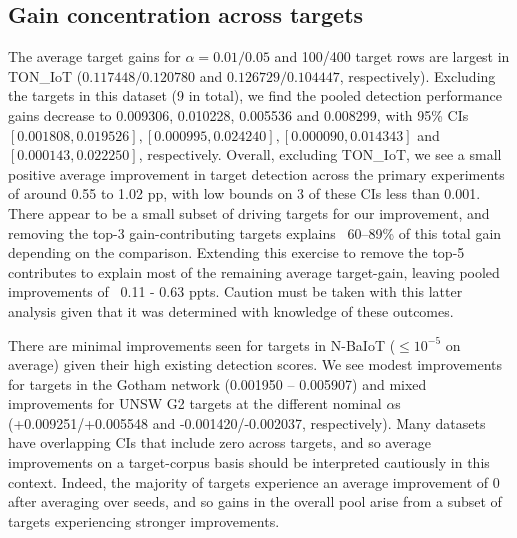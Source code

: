 \subsection{Gain concentration across targets} 
The average target gains for $\alpha=0.01/0.05$ and 100/400 target rows are largest in TON\_IoT ($0.117448 / 0.120780$ and $0.126729 / 0.104447$, respectively). Excluding the targets in this dataset (9 in total), we find the pooled detection performance gains decrease to 0.009306, 0.010228, 0.005536 and 0.008299, with 95\% CIs $[0.001808, 0.019526], [0.000995, 0.024240], [0.000090, 0.014343]$ and $[0.000143, 0.022250]$, respectively. Overall, excluding TON\_IoT, we see a small positive average improvement in target detection across the primary experiments of around 0.55 to 1.02 pp, with low bounds on 3 of these CIs less than 0.001. There appear to be a small subset of driving targets for our improvement, and removing the top-3 gain-contributing targets explains ~60--89\% of this total gain depending on the comparison. Extending this exercise to remove the top-5 contributes to explain most of the remaining average target-gain, leaving pooled improvements of ~0.11 - 0.63 ppts. Caution must be taken with this latter analysis given that it was determined with knowledge of these outcomes.

There are minimal improvements seen for targets in N-BaIoT ($\leq 10^{-5}$ on average) given their high existing detection scores. We see modest improvements for targets in the Gotham network (0.001950 -- 0.005907) and mixed improvements for UNSW G2 targets at the different nominal $\alpha$s (+0.009251/+0.005548 and -0.001420/-0.002037, respectively). Many datasets have overlapping CIs that include zero across targets, and so average improvements on a target-corpus basis should be interpreted cautiously in this context. Indeed, the majority of targets experience an average improvement of 0 after averaging over seeds, and so gains in the overall pool arise from a subset of targets experiencing stronger improvements.

